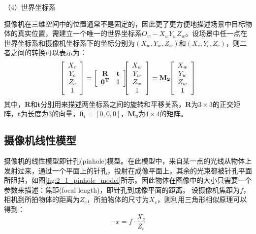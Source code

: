 （4）世界坐标系

摄像机在三维空间中的位置通常不是固定的，因此更了更方便地描述场景中目标物体的真实位置，需建立一个唯一的世界坐标系$O_w-X_wY_wZ_w$。设场景中任一点在世界坐标系和摄像机坐标系下的坐标分别为$(X_w, Y_w, Z_w)$和$(X_c, Y_c, Z_c)$，则二者之间的转换可以表示为：
%
\begin{eqnarray}\label{eq:2_1_world_camera_coord_transform}
\left[\begin{array}{c} X_c \\ Y_c \\ Z_c \\ 1 \end{array} \right]
=
\left[\begin{array}{cc}
\mathbf{R} & \mathbf{t}  \\
\mathbf{0^T} & 1
\end{array}
\right]
\hspace{-6pt} %
\left[\begin{array}{c} X_w \\ Y_w \\ Z_w \\ 1 \end{array}\right]
=\mathbf{M_2}
\hspace{-3pt} 
\left[\begin{array}{c} X_w \\ Y_w \\ Z_w \\ 1 \end{array}\right]
\end{eqnarray}
其中，$\mathbf{R}$和$\mathbf{t}$分别用来描述两坐标系之间的旋转和平移关系，$\mathbf{R}$为$3\times 3$的正交矩阵，$\mathbf{t}$为长度为3的向量，$\mathbf{0_t}=[0, 0, 0]$，$\mathbf{M_2}$为$4\times4$的矩阵。


\subsection{摄像机线性模型}
摄像机的线性模型即针孔(pinhole)模型\cite{zhang1999flexible, zhang2000flexible}。在此模型中，来自某一点的光线从物体上发射过来，通过一个平面上的针孔，投射在成像平面上，其余的光束都被针孔平面所阻挡，如图\ref{fig:2_1_pinhole_model}所示。因此物体在图像中的大小只需要一个参数来描述：焦距(focal length)，即针孔到成像平面的距离。 设摄像机焦距为$f$，相机到所拍物体的距离为$Z_c$，所拍物体的尺寸为$X_c$，则利用三角形相似原理可以得到：
%
\begin{equation}\label{eq:2_1_triangular_similarity}
-x = f \cdot \frac{X_c}{Z_c}
\end{equation}

